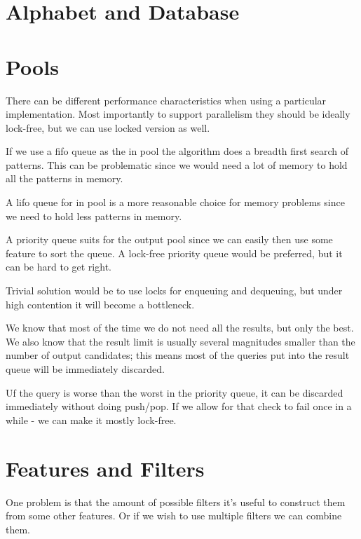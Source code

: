 \section{Alphabet and Database}


\section{Pools}

There can be different performance characteristics when using a particular implementation. Most importantly to support parallelism they should be ideally lock-free, but we can use locked version as well.


If we use a fifo queue as the in pool the algorithm does a breadth first search of patterns. This can be problematic since we would need a lot of memory to hold all the patterns in memory.

A lifo queue for in pool is a more reasonable choice for memory problems since we need to hold less patterns in memory.

A priority queue suits for the output pool since we can easily then use some feature to sort the queue. A lock-free priority queue would be preferred, but it can be hard to get right. 

Trivial solution would be to use locks for enqueuing and dequeuing, but under high contention it will become a bottleneck.

We know that most of the time we do not need all the results, but only the best. We also know that the result limit is usually several magnitudes smaller than the number of output candidates; this means most of the queries put into the result queue will be immediately discarded.

Uf the query is worse than the worst in the priority queue, it can be discarded immediately without doing push/pop. If we allow for that check to fail once in a while - we can make it mostly lock-free.

\section{Features and Filters}


One problem is that the amount of possible filters it's useful to construct them from some other features. Or if we wish to use multiple filters we can combine them.

